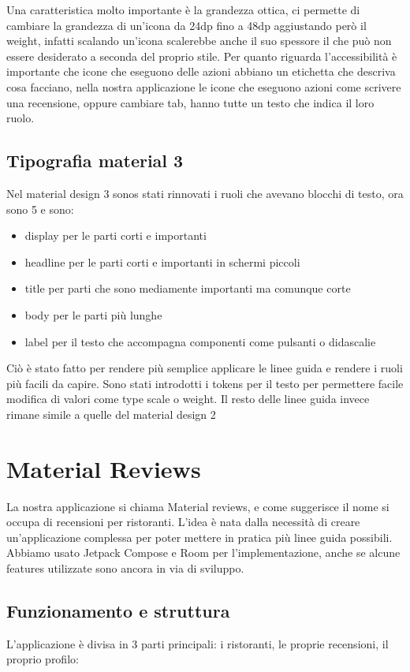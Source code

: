 \documentclass[12pt, a4paper]{report}
\begin{document}
		Una caratteristica molto importante è la grandezza ottica, ci permette di cambiare la grandezza di un'icona da 24dp fino a 48dp aggiustando però il weight, infatti scalando un'icona scalerebbe anche il suo spessore il che può non essere desiderato a seconda del proprio stile.
		Per quanto riguarda l'accessibilità è importante che icone che eseguono delle azioni abbiano un etichetta che descriva cosa facciano, nella nostra applicazione le icone che eseguono azioni come scrivere una recensione, oppure cambiare tab, hanno tutte un testo che indica il loro ruolo.
	\section{Tipografia material 3}
		Nel material design 3 sonos stati rinnovati i ruoli che avevano blocchi di testo, ora sono 5 e sono:
		\begin{itemize}
			\item display per le parti corti e importanti
			\item headline per le parti corti e importanti in schermi piccoli
			\item title	per parti che sono mediamente importanti ma comunque corte
			\item body per le parti più lunghe
			\item label per il testo che accompagna componenti come pulsanti o didascalie
		\end{itemize}
		Ciò è stato fatto per rendere più semplice applicare le linee guida e rendere i ruoli più facili da capire.
		Sono stati introdotti i tokens per il testo per permettere facile modifica di valori come type scale o weight.
		Il resto delle linee guida invece rimane simile a quelle del material design 2
	
\chapter{Material Reviews}
	La nostra applicazione si chiama Material reviews, e come suggerisce il nome si occupa di recensioni per ristoranti.
	L'idea è nata dalla necessità di creare un'applicazione complessa per poter mettere in pratica più linee guida possibili.
	Abbiamo usato Jetpack Compose \cite{compose} e Room\cite{room} per l'implementazione, anche se alcune features utilizzate sono ancora in via di sviluppo.
	\section{Funzionamento e struttura}
	L'applicazione è divisa in 3 parti principali: i ristoranti, le proprie recensioni, il proprio profilo:
\end{document}
